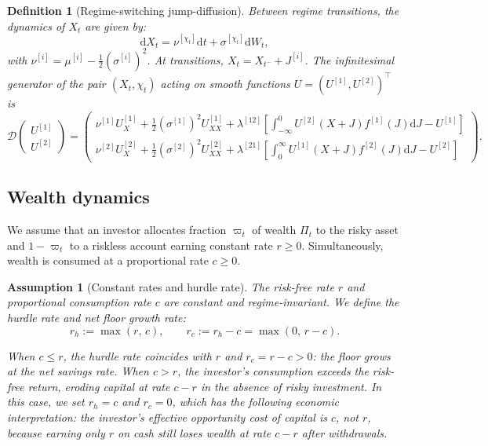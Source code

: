 \documentclass[11pt,a4paper]{article}
\numberwithin{equation}{section}
\newtheorem{definition}[theorem]{Definition}
\newtheorem{assumption}[theorem]{Assumption}
\newcommand{\dd}{\mathrm{d}}
\begin{document}
\begin{definition}[Regime-switching jump-diffusion]\label{def:jump_diffusion}
Between regime transitions, the dynamics of $X_t$ are given by:
\begin{equation}\label{eq:jump_diffusion}
\dd X_t = \nu^{[\chi_t]} \dd t + \sigma^{[\chi_t]} \dd W_t,
\end{equation}
with $\nu^{[i]} = \mu^{[i]} - \tfrac{1}{2}(\sigma^{[i]})^2$. At transitions, $X_t = X_{t^-} + J^{[i]}$. The infinitesimal generator of the pair $(X_t, \chi_t)$ acting on smooth functions $U = (U^{[1]}, U^{[2]})^\top$ is
\begin{equation}\label{eq:generator_full}
\mathcal{D} \begin{pmatrix} U^{[1]} \\ U^{[2]} \end{pmatrix} =
\begin{pmatrix}
\nu^{[1]} U^{[1]}_X + \tfrac{1}{2}(\sigma^{[1]})^2 U^{[1]}_{XX} + \lambda^{[12]} \left[\int_{-\infty}^{0} U^{[2]}(X+J) f^{[1]}(J) \dd J - U^{[1]}\right] \\[6pt]
\nu^{[2]} U^{[2]}_X + \tfrac{1}{2}(\sigma^{[2]})^2 U^{[2]}_{XX} + \lambda^{[21]} \left[\int_{0}^{\infty} U^{[1]}(X+J) f^{[2]}(J) \dd J - U^{[2]}\right]
\end{pmatrix}.
\end{equation}

\end{definition}



\subsection{Wealth dynamics}\label{sec:wealth}

We assume that an investor allocates fraction $\varpi_t$ of wealth $\Pi_t$ to the risky asset and $1 - \varpi_t$ to a riskless account earning constant rate $r \geq 0$. Simultaneously, wealth is consumed at a proportional rate $c \geq 0$.

\begin{assumption}[Constant rates and hurdle rate]\label{ass:r_constant}
The risk-free rate $r$ and proportional consumption rate $c$ are constant and regime-invariant.  We define the hurdle rate and net floor growth rate:
\begin{equation}\label{eq:hurdle}
r_h := \max(r,\, c), \qquad r_c := r_h - c = \max(0,\, r - c).
\end{equation}

When $c \leq r$, the hurdle rate coincides with $r$ and $r_c = r - c > 0$: the floor grows at the net savings rate.  When $c > r$, the investor's consumption exceeds the risk-free return, eroding capital at rate $c - r$ in the absence of risky investment.  In this case, we set $r_h = c$ and $r_c = 0$, which has the following economic interpretation: the investor's effective opportunity cost of capital is $c$, not $r$, because earning only $r$ on cash still loses wealth at rate $c - r$ after withdrawals.
\end{assumption}
\end{document}
